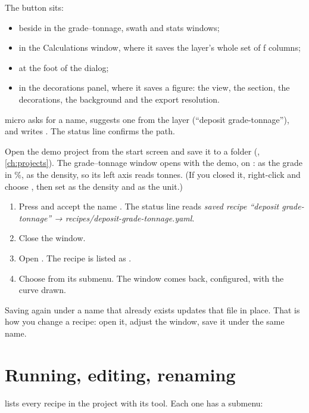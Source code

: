 The  button sits:
\begin{itemize}
\item beside  in the grade–tonnage, swath and stats windows;
\item in the Calculations window, where it saves the layer's whole set of ƒ columns;
\item at the foot of the  dialog;
\item in the decorations panel, where it saves a figure: the view, the section, the decorations, the background and the export resolution.
\end{itemize}
micro asks for a name, suggests one from the layer (``deposit grade-tonnage''), and writes . The status line confirms the path.

\begin{tryit}
Open the demo project from the start screen and save it to a folder (, \cref{ch:projects}). The grade–tonnage window opens with the demo, on :  as the grade in \%,  as the density, so its left axis reads tonnes. (If you closed it, right-click  and choose , then set  as the density and \ui{\%} as the unit.)
\begin{enumerate}
\item Press  and accept the name . The status line reads \emph{saved recipe “deposit grade-tonnage” → recipes/deposit-grade-tonnage.yaml}.
\item Close the window.
\item Open . The recipe is listed as .
\item Choose  from its submenu. The window comes back, configured, with the curve drawn.
\end{enumerate}
\end{tryit}

Saving again under a name that already exists updates that file in place. That is how you change a recipe: open it, adjust the window, save it under the same name.

\section{Running, editing, renaming}\label{sec:recipes-menu}
 lists every recipe in the project with its tool. Each one has a submenu:

